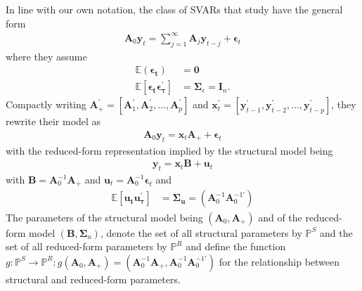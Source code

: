 \documentclass[a4paper,11pt,listof=nochaptergap,oneside,pointednumbers,bibtotoc,bigheadings,liststotoc,hidelinks]{scrbook}
\theoremstyle{mysatz}
\theoremstyle{mydefinition}
\theoremstyle{mytheorem}
\theoremstyle{mybemerkung}
\newcommand{\vect}[1]{\boldsymbol{\mathbf{#1}}}
\begin{document}
In line with our own notation, the class of SVARs that \citet{rubioetal:10} study have the general form
\begin{equation} \label{eq:svar_1}
\begin{split}
	\vect{A}_0 \vect{y}_t = \sum\limits_{j=1}^\infty \vect{A}_j\vect{y}_{t-j} + \vect{\epsilon}_t
\end{split}								
\end{equation}
where they assume 
\begin{equation}\label{eq:svar_2}
\begin{split}
	\mathbb{E}(\vect{\epsilon_t}) &  = \vect{0}  \\
	\mathbb{E}[\vect{\epsilon_t}\vect{\epsilon_{\tau}^'}] & = \vect{\Sigma}_\epsilon = \vect{I}_n.
\end{split}								
\end{equation}
Compactly writing $\vect{A}_{+}^' = [\vect{A}_1^', \vect{A}_2^', \dots, \vect{A}_p^']$ and $\vect{x}_{t}^' = [\vect{y}_{t-1}^', \vect{y}_{t-2}^', \dots, \vect{y}_{t-p}^']$, they rewrite their model as
\begin{equation}\label{eq:svar_3}
\begin{split}
	\vect{A}_0 \vect{y}_t =  \vect{x}_t \vect{A}_+ + \vect{\epsilon}_t
\end{split}								
\end{equation}
with the reduced-form representation implied by the structural model being
\begin{equation}\label{eq:svar_4}
\begin{split}
	 \vect{y}_t =  \vect{x}_t \vect{B} + \vect{u}_t
\end{split}								
\end{equation}
with $\vect{B} = \vect{A}_0^{-1}\vect{A}_+$ and $\vect{u}_t = \vect{A}_0^{-1}\vect{\epsilon}_t$ and
	\begin{equation} \label{eq:svar_5}
	\begin{split}
		\mathbb{E}[\vect{u_t}\vect{u_{\tau}^'}] & = 
      												\vect{\Sigma_u} = (\vect{A}_0^{-1}\vect{A}_0^{-1'})
	\end{split}								
	\end{equation}	
The parameters of the structural model being $(\vect{A}_0, \vect{A}_+)$ and of the reduced-form model $(\vect{B}, \vect{\Sigma}_u)$, \citet{rubioetal:10} denote the set of all structural parameters by $\mathbb{P}^S$ and the set of all reduced-form parameters by $\mathbb{P}^R$ and define the function $g: \mathbb{P}^S \to \mathbb{P}^R: g(\vect{A}_0, \vect{A}_+) = (\vect{A}_0^{-1}\vect{A}_+, \vect{A}_0^{-1}\vect{A}_0^{-1'})$ for the relationship between structural and reduced-form parameters.\\
\end{document}
